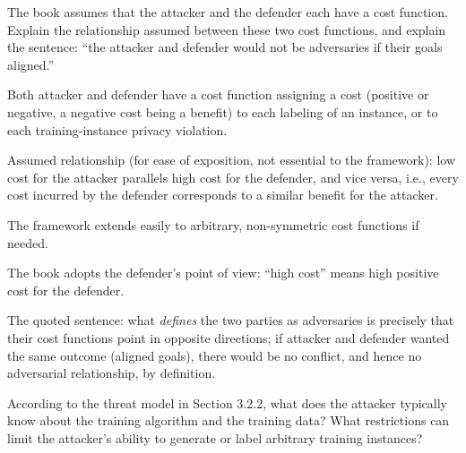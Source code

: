 \documentclass[10pt]{extarticle}
\newcommand{\resposta}[1]{\par\smallskip\noindent #1}
\begin{document}
\begin{questoes}
\item The book assumes that the attacker and the defender each have a cost function. Explain the relationship assumed between these two cost functions, and explain the sentence: ``the attacker and defender would not be adversaries if their goals aligned.''

\resposta{
\begin{topicos}
\item Both attacker and defender have a cost function assigning a cost (positive or negative, a negative cost being a benefit) to each labeling of an instance, or to each training-instance privacy violation.
\item Assumed relationship (for ease of exposition, not essential to the framework): low cost for the attacker parallels high cost for the defender, and vice versa, i.e., every cost incurred by the defender corresponds to a similar benefit for the attacker.
\item The framework extends easily to arbitrary, non-symmetric cost functions if needed.
\item The book adopts the defender's point of view: ``high cost'' means high positive cost for the defender.
\item The quoted sentence: what \emph{defines} the two parties as adversaries is precisely that their cost functions point in opposite directions; if attacker and defender wanted the same outcome (aligned goals), there would be no conflict, and hence no adversarial relationship, by definition.
\end{topicos}
}

\item According to the threat model in Section 3.2.2, what does the attacker typically know about the training algorithm and the training data? What restrictions can limit the attacker's ability to generate or label arbitrary training instances?


\end{questoes}
\end{document}
